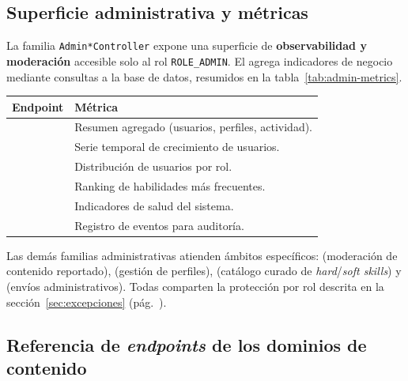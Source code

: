 \subsection{Superficie administrativa y métricas}
\label{subsec:admin}

La familia \texttt{Admin*Controller} expone una superficie de \textbf{observabilidad y
moderación} accesible solo al rol \texttt{ROLE\_ADMIN}. El 
agrega indicadores de negocio mediante consultas a la base de datos, resumidos en la
tabla~\ref{tab:admin-metrics}.

\vspace{0.2cm}
\noindent
\renewcommand{\arraystretch}{1.3}
\fontsize{8}{9.6}\selectfont\sffamily
\begin{tabularx}{\textwidth}{|L{5.2cm}|Y|}
\hline
{}
\sffamily\textbf{Endpoint} & \sffamily\textbf{Métrica} \\
\hline
{} & Resumen agregado (usuarios, perfiles, actividad). \\ \hline
{}
 & Serie temporal de crecimiento de usuarios. \\ \hline
{} & Distribución de usuarios por rol. \\ \hline
{}
 & Ranking de habilidades más frecuentes. \\ \hline
{} & Indicadores de salud del sistema. \\ \hline
{}
 & Registro de eventos para auditoría. \\ \hline
\end{tabularx}
\label{tab:admin-metrics}

Las demás familias administrativas atienden ámbitos específicos:
 (moderación de contenido reportado),
 (gestión de perfiles), 
(catálogo curado de \textit{hard}/\textit{soft skills}) y 
(envíos administrativos). Todas comparten la protección por rol descrita en la
sección~\ref{sec:excepciones} (pág.~\pageref{sec:excepciones}).

\subsection{Referencia de \textit{endpoints} de los dominios de contenido}
\label{subsec:endpoints_contenido}

